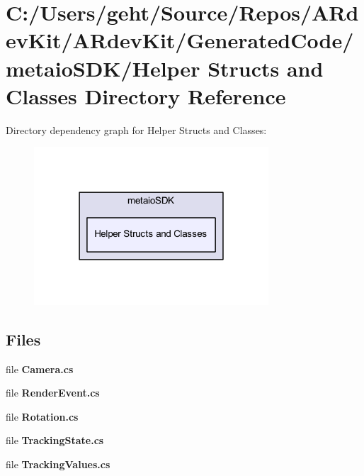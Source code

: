 \section{C\-:/\-Users/geht/\-Source/\-Repos/\-A\-Rdev\-Kit/\-A\-Rdev\-Kit/\-Generated\-Code/metaio\-S\-D\-K/\-Helper Structs and Classes Directory Reference}
\label{dir_491cf79b4a2234cefbbfd75b10acc9cb}
Directory dependency graph for Helper Structs and Classes\-:
\nopagebreak
\begin{figure}[H]
\begin{center}
\leavevmode
\includegraphics[width=248pt]{dir_491cf79b4a2234cefbbfd75b10acc9cb_dep}
\end{center}
\end{figure}
\subsection*{Files}
\begin{DoxyCompactItemize}
\item 
file {\bfseries Camera.\-cs}
\item 
file {\bfseries Render\-Event.\-cs}
\item 
file {\bfseries Rotation.\-cs}
\item 
file {\bfseries Tracking\-State.\-cs}
\item 
file {\bfseries Tracking\-Values.\-cs}
\end{DoxyCompactItemize}
